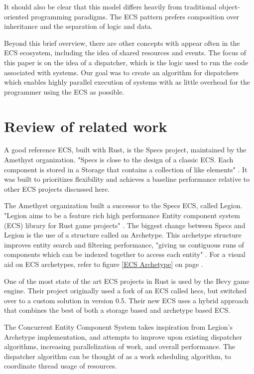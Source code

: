 \documentclass[conference]{IEEEtran}
\begin{document}
It should also be clear that this model differs heavily from traditional object-oriented programming paradigms. The ECS pattern prefers composition over inheritance and the separation of logic and data.

Beyond this brief overview, there are other concepts with appear often in the ECS ecosystem, including the idea of shared resources and events. The focus of this paper is on the idea of a dispatcher, which is the logic used to run the code associated with systems. Our goal was to create an algorithm for dispatchers which enables highly parallel execution of systems with as little overhead for the programmer using the ECS as possible. 

\section{Review of related work}
A good reference ECS, built with Rust, is the Specs project, maintained by the Amethyst organization. "Specs is close to the design of a classic ECS. Each component is stored in a Storage that contains a collection of like elements" \cite{sherratt_2020}. It was built to prioritizes flexibility and achieves a baseline performance relative to other ECS projects discussed here. 

The Amethyst organization built a successor to the Specs ECS, called Legion. "Legion aims to be a feature rich high performance Entity component system (ECS) library for Rust game projects" \cite{amethyst_github}. The biggest change between Specs and Legion is the use of a structure called an Archetype. This archetype structure improves entity search and filtering performance, "giving us contiguous runs of components which can be indexed together to access each entity" \cite{gillen_2020}. For a visual aid on ECS archetypes, refer to figure \ref{ECS Archetype} on page \pageref{ECS Archetype}. 

One of the most state of the art ECS projects in Rust is used by the Bevy game engine. Their project originally used a fork of an ECS called hecs, but switched over to a custom solution in version 0.5. Their new ECS uses a hybrid approach that combines the best of both a storage based and archetype based ECS.

The Concurrent Entity Component System takes inspiration from Legion's Archetype implementation, and attempts to improve upon existing dispatcher algorithms, increasing parallelization of work, and overall performance. The dispatcher algorithm can be thought of as a work scheduling algorithm, to coordinate thread usage of resources. 
\end{document}
